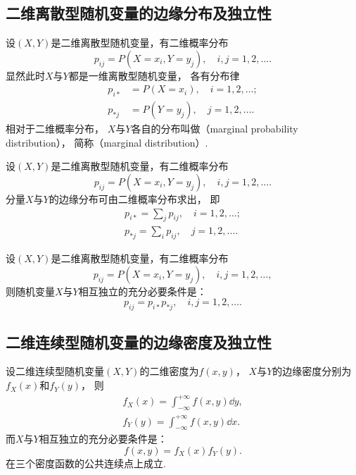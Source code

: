 \subsection{二维离散型随机变量的边缘分布及独立性}
\begin{definition}
设\((X,Y)\)是二维离散型随机变量，有二维概率分布\begin{equation*}
	p_{ij} = P(X=x_i,Y=y_j),
	\quad i,j=1,2,\dotsc.
\end{equation*}
显然此时\(X\)与\(Y\)都是一维离散型随机变量，
各有分布律\begin{align*}
	p_{i*} &= P(X=x_i),
	\quad i=1,2,\dotsc; \\
	p_{*j} &= P(Y=y_j),
	\quad j=1,2,\dotsc.
\end{align*}
相对于二维概率分布，
\(X\)与\(Y\)各自的分布叫做（marginal probability distribution），
简称（marginal distribution）.
\end{definition}

\begin{theorem}
设\((X,Y)\)是二维离散型随机变量，有二维概率分布\begin{equation*}
	p_{ij} = P(X=x_i,Y=y_j),
	\quad i,j=1,2,\dotsc.
\end{equation*}
分量\(X\)与\(Y\)的边缘分布可由二维概率分布求出，
即\begin{gather*}
	p_{i*} = \sum_j p_{ij},
	\quad i=1,2,\dotsc; \\
	p_{*j} = \sum_i p_{ij},
	\quad j=1,2,\dotsc.
\end{gather*}
\end{theorem}

\begin{theorem}\label{theorem:多维随机变量及其分布.两个离散型随机变量相互独立的充分必要条件}
设\((X,Y)\)是二维离散型随机变量，有二维概率分布\begin{equation*}
	p_{ij} = P(X=x_i,Y=y_j),
	\quad i,j=1,2,\dotsc,
\end{equation*}
则随机变量\(X\)与\(Y\)相互独立的充分必要条件是：\begin{equation*}
	p_{ij} = p_{i*} p_{*j},
	\quad i,j=1,2,\dotsc.
\end{equation*}
\end{theorem}

\subsection{二维连续型随机变量的边缘密度及独立性}
\begin{theorem}\label{theorem:多维随机变量及其分布.两个连续型随机变量相互独立的充分必要条件}
设二维连续型随机变量\((X,Y)\)的二维密度为\(f(x,y)\)，
\(X\)与\(Y\)的边缘密度分别为\(f_X(x)\)和\(f_Y(y)\)，
则\begin{align*}
	f_X(x) = \int_{-\infty}^{+\infty} f(x,y) \dd{y}, \\
	f_Y(y) = \int_{-\infty}^{+\infty} f(x,y) \dd{x}.
\end{align*}
而\(X\)与\(Y\)相互独立的充分必要条件是：\begin{equation*}
	f(x,y) = f_X(x) f_Y(y).
\end{equation*}在三个密度函数的公共连续点上成立.
\end{theorem}
